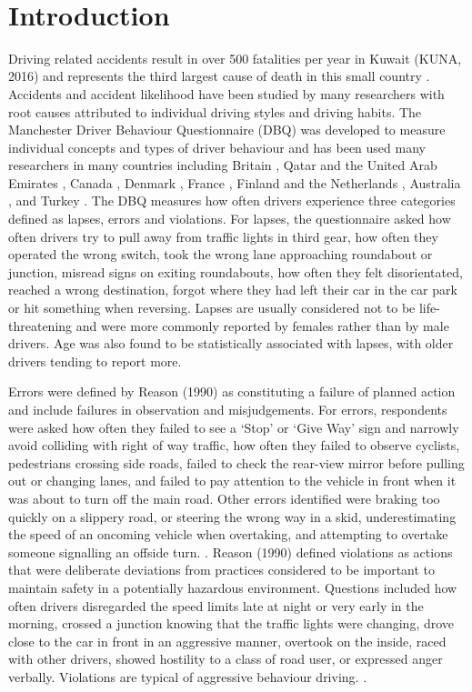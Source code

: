 \documentclass[preprint,12pt,a4paper,authoryear]{elsarticle}
\begin{document}
\begin{linenumbers}
\begin{frontmatter}
\end{frontmatter}
 
\section{Introduction}
Driving related accidents result in over 500 fatalities per year in Kuwait (KUNA, 2016) and represents the third largest cause of death in this small country \citep{Wang2016}. Accidents and accident likelihood have been studied by many researchers with root causes attributed to individual driving styles and driving habits.  The Manchester Driver Behaviour Questionnaire (DBQ) was developed to measure individual concepts and types of driver behaviour and has been used many researchers in many countries including Britain \citep{Reason1990}, Qatar and the United Arab Emirates \citep{Bener2008}, Canada \citep{Cordazzo2014}, Denmark \citep{Martinussen2013}, France \citep{Gu2014}, Finland and the Netherlands \citep{Lajunen2004}, Australia \citep{Stephens2016}, and Turkey \citep{Sumer2003}. 
The DBQ measures how often drivers experience three categories defined as lapses, errors and violations. For lapses, the questionnaire asked how often drivers try to pull away from traffic lights in third gear, how often they operated the wrong switch, took the wrong lane approaching roundabout or junction, misread signs on exiting roundabouts, how often they felt disorientated, reached a wrong destination, forgot where they had left their car in the car park or hit something when reversing. Lapses are usually considered not to be life-threatening and were more commonly reported by females rather than by male drivers. Age was also found to be statistically associated with lapses, with older drivers tending to report more. 

Errors were defined by Reason (1990) as constituting a failure of planned action and include failures in observation and misjudgements. For errors, respondents were asked how often they failed to see a `Stop' or `Give Way' sign and narrowly avoid colliding with right of way traffic, how often they failed to observe cyclists, pedestrians crossing side roads, failed to check the rear-view mirror before pulling out or changing lanes, and failed to pay attention to the vehicle in front when it was about to turn off the main road. Other errors identified were braking too quickly on a slippery road, or steering the wrong way in a skid, underestimating the speed of an oncoming vehicle when overtaking, and attempting to overtake someone signalling an offside turn. \citep{Reason1990}. 
Reason (1990) defined violations as  actions that were deliberate deviations from practices considered to be important to maintain safety in a potentially hazardous environment. Questions included how often drivers disregarded the speed limits late at night or very early in the morning, crossed a junction knowing that the traffic lights were changing, drove close to the car in front in an aggressive manner, overtook on the inside, raced with other drivers, showed hostility to a class of road user, or expressed anger verbally. Violations are typical of aggressive behaviour driving. \citep{Reason1990}. 


\end{linenumbers}
\end{document}
